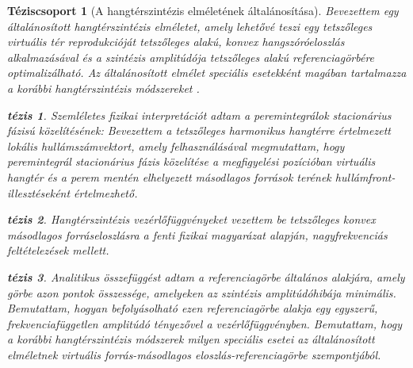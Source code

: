 \documentclass[10pt,twoside]{article}
\theoremstyle{thesisgroupstyle}
\newtheorem{thesisgroup}{Téziscsoport}
\theoremstyle{indented}
\newtheorem{thesis}{tézis}[thesisgroup]
\begin{document}
\begin{thesisgroup}[A hangtérszintézis elméletének általánosítása]
Bevezettem egy általánosított hangtérszintézis elméletet, amely lehetővé teszi egy tetszőleges virtuális tér reprodukcióját tetszőleges alakú, konvex hangszóróeloszlás alkalmazásával és a szintézis amplitúdója tetszőleges alakú referenciagörbére optimalizálható.
Az általánosított elmélet speciális esetekként magában tartalmazza  a korábbi hangtérszintézis módszereket \cite{Firtha2016_booklet}.
\begin{thesis}
Szemléletes fizikai interpretációt adtam a peremintegrálok stacionárius fázisú közelítésének:
Bevezettem a tetszőleges harmonikus hangtérre értelmezett lokális hullámszámvektort, amely felhasználásával megmutattam, hogy peremintegrál stacionárius fázis közelítése a megfigyelési pozícióban virtuális hangtér és a perem mentén elhelyezett másodlagos források terének hullámfront-illesztéseként értelmezhető.
\end{thesis}
\begin{thesis}
Hangtérszintézis vezérlőfüggvényeket vezettem be tetszőleges konvex másodlagos forráseloszlásra a fenti fizikai magyarázat alapján, nagyfrekvenciás feltételezések mellett.
\end{thesis}
\begin{thesis}
Analitikus összefüggést adtam a referenciagörbe általános alakjára, amely görbe azon pontok összessége, amelyeken az szintézis amplitúdóhibája minimális.
Bemutattam, hogyan befolyásolható ezen referenciagörbe alakja egy egyszerű, frekvenciafüggetlen amplitúdó tényezővel a vezérlőfüggvényben.
Bemutattam, hogy a korábbi hangtérszintézis módszerek milyen speciális esetei az általánosított elméletnek virtuális forrás-másodlagos eloszlás-referenciagörbe szempontjából.
\end{thesis}
\end{thesisgroup}
\end{document}
